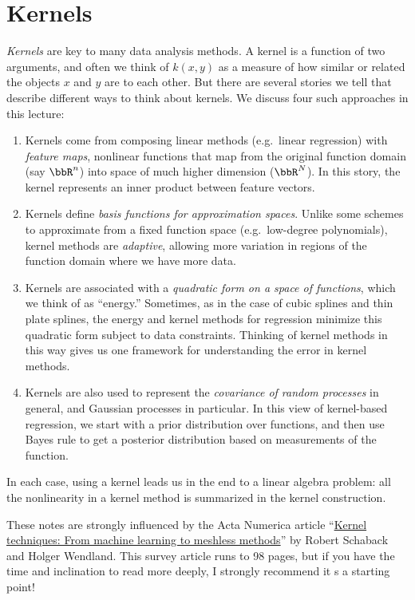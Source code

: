 \documentclass[12pt, leqno]{article} %
\begin{document}


\section{Kernels}

{\em Kernels} are key to many data analysis methods.  A kernel is a
function of two arguments, and often we think of $k(x,y)$ as a measure
of how similar or related the objects $x$ and $y$ are to each other.
But there are several stories we tell that describe different ways to
think about kernels.  We discuss four such approaches in this lecture:
\begin{enumerate}
\item
  Kernels come from composing linear methods (e.g.~linear regression)
  with {\em feature maps}, nonlinear functions that map from the
  original function domain (say $\bbR^n$) into space of much higher
  dimension ($\bbR^N$).  In this story, the kernel represents an inner product
  between feature vectors.
\item
  Kernels define {\em basis functions for approximation spaces}.  Unlike
  some schemes to approximate from a fixed function space
  (e.g.~low-degree polynomials), kernel methods are {\em adaptive},
  allowing more variation in regions of the function domain where we
  have more data.
\item
  Kernels are associated with a {\em quadratic form on a space of
  functions}, which we think of as ``energy.''  Sometimes, as in the
  case of cubic splines and thin plate splines, the energy and kernel methods
  for regression minimize this quadratic form subject to data
  constraints.  Thinking of kernel methods in this way gives us one
  framework for understanding the error in kernel methods.
\item
  Kernels are also used to represent the {\em covariance of random
  processes} in general, and Gaussian processes in particular.  In this
  view of kernel-based regression, we start with a prior distribution
  over functions, and then use Bayes rule to get a posterior
  distribution based on measurements of the function.
\end{enumerate}
In each case, using
a kernel leads us in the end to a linear algebra problem: all the
nonlinearity in a kernel method is summarized in the kernel construction.

These notes are strongly influenced by the Acta Numerica article
``\href{https://dx.doi.org/10.1017/S0962492906270016}{Kernel
  techniques: From machine learning to meshless methods}''
by Robert Schaback and Holger Wendland.  This survey article runs to
98 pages, but if you have the time and inclination to read more
deeply, I strongly recommend it s a starting point!
\end{document}
